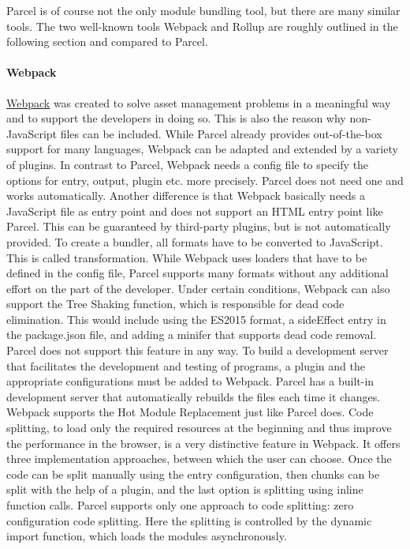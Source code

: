 Parcel is of course not the only module bundling tool, but there are many similar tools. The two well-known tools Webpack and Rollup are roughly outlined in the following section and compared to Parcel.

\paragraph{Webpack}
\label{par:tecWebpack}
\href{https://webpack.js.org}{Webpack} was created to solve asset management problems in a meaningful way and to support the developers in doing so. This is also the reason why non-JavaScript files can be included. While Parcel already provides out-of-the-box support for many languages, Webpack can be adapted and extended by a variety of plugins. In contrast to Parcel, Webpack needs a config file to specify the options for entry, output, plugin etc. more precisely. Parcel does not need one and works automatically. Another difference is that Webpack basically needs a JavaScript file as entry point and does not support an HTML entry point like Parcel. This can be guaranteed by third-party plugins, but is not automatically provided. To create a bundler, all formats have to be converted to JavaScript. This is called transformation. While Webpack uses loaders that have to be defined in the config file, Parcel supports many formats without any additional effort on the part of the developer. Under certain conditions, Webpack can also support the Tree Shaking function, which is responsible for dead code elimination. This would include using the ES2015 format, a sideEffect entry in the package.json file, and adding a minifer that supports dead code removal. Parcel does not support this feature in any way. To build a development server that facilitates the development and testing of programs, a plugin and the appropriate configurations must be added to Webpack. Parcel has a built-in development server that automatically rebuilds the files each time it changes. Webpack supports the Hot Module Replacement just like Parcel does. Code splitting, to load only the required resources at the beginning and thus improve the performance in the browser, is a very distinctive feature in Webpack. It offers three implementation approaches, between which the user can choose. Once the code can be split manually using the entry configuration, then chunks can be split with the help of a plugin, and the last option is splitting using inline function calls. Parcel supports only one approach to code splitting: zero configuration code splitting. Here the splitting is controlled by the dynamic import function, which loads the modules asynchronously.

